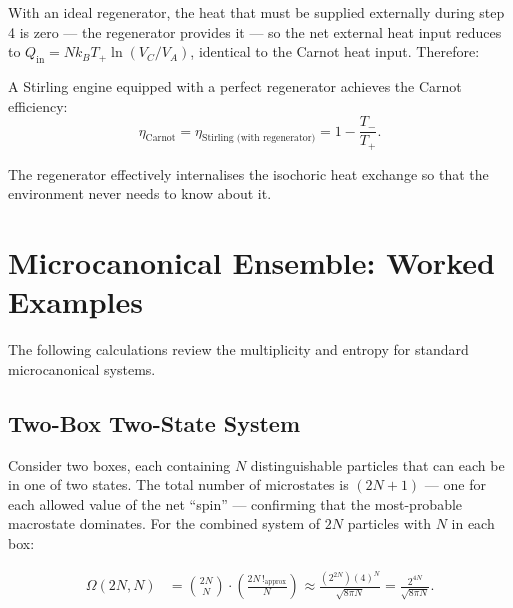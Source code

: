 With an ideal regenerator, the heat that must be supplied externally during step 4 is zero — the regenerator provides it — so the net external heat input reduces to $Q_{\text{in}} = Nk_BT_+\ln(V_C/V_A)$, identical to the Carnot heat input. Therefore:

\begin{theorem}
A Stirling engine equipped with a perfect regenerator achieves the Carnot efficiency:
\begin{equation}
    \eta_{\text{Carnot}} = \eta_{\text{Stirling (with regenerator)}} = 1 - \frac{T_-}{T_+}.
\end{equation}
\end{theorem}

The regenerator effectively internalises the isochoric heat exchange so that the environment never needs to know about it.


\section{Microcanonical Ensemble: Worked Examples}

The following calculations review the multiplicity and entropy for standard microcanonical systems.

\subsection{Two-Box Two-State System}

Consider two boxes, each containing $N$ distinguishable particles that can each be in one of two states. The total number of microstates is $(2N+1)$ — one for each allowed value of the net ``spin'' — confirming that the most-probable macrostate dominates. For the combined system of $2N$ particles with $N$ in each box:

\begin{align}
    \Omega(2N, N) &= \binom{2N}{N} \cdot \left(\frac{2N\,!_{\text{approx}}}{N}\right)^{\!} \approx \frac{(2^{2N})(4)^N}{\sqrt{8\pi N}} = \frac{2^{4N}}{\sqrt{8\pi N}}.
\end{align}

